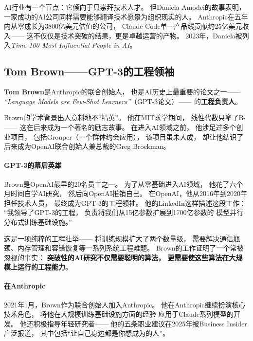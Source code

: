 \begin{corebox}
AI行业有一个盲点：它倾向于只崇拜技术人才。
但Daniela Amodei的故事表明，
一家成功的AI公司同样需要能够翻译技术愿景为组织现实的人。
Anthropic在五年内从零成长为3800亿美元估值的公司，
Claude Code单一产品线贡献约25亿美元收入——
这不仅仅是技术突破的结果，更是卓越运营的产物。
2023年，Daniela被列入\textit{Time 100 Most Influential People in AI}。
\end{corebox}

\subsection{Tom Brown——GPT-3的工程领袖}
\label{subsec:tom-brown-anthropic}

\textbf{Tom Brown}是Anthropic的联合创始人，
也是AI历史上最重要的论文之一——
\textit{``Language Models are Few-Shot Learners''}（GPT-3论文）——
的\textbf{工程负责人}。

Brown的学术背景出人意料地不``精英''。
他在MIT求学期间，
线性代数只拿了B-——
这在后来成为一个著名的励志故事。
在进入AI领域之前，
他涉足过多个创业项目，
包括Grouper（一个群体约会应用），
该项目虽未大成，
却让他结识了后来成为OpenAI联合创始人兼总裁的Greg Brockman。

\paragraph{GPT-3的幕后英雄}
Brown是OpenAI最早的20名员工之一。
为了从零基础进入AI领域，
他花了六个月时间自学AI研究，
然后向OpenAI推销自己。
在OpenAI，他从2016年到2020年担任技术人员，
最终成为GPT-3的工程领袖。
他的LinkedIn这样描述这段工作：
``我领导了GPT-3的工程，
负责将我们从15亿参数扩展到1700亿参数的
模型并行分布式训练基础设施。''

这是一项纯粹的工程壮举——
将训练规模扩大了两个数量级，
需要解决通信瓶颈、内存管理和容错恢复等一系列系统工程难题。
Brown的工作证明了一个常被忽视的事实：
\textbf{突破性的AI研究不仅需要聪明的算法，
更需要使这些算法在大规模上运行的工程能力}。

\paragraph{在Anthropic}
2021年1月，Brown作为联合创始人加入Anthropic。
他在Anthropic继续扮演核心技术角色，
将他在大规模训练基础设施方面的经验
应用于Claude系列模型的开发。
他还积极指导年轻研究者——
他的五条职业建议在2025年被Business Insider广泛报道，
其中包括``让自己身边都是你想成为的人''。

